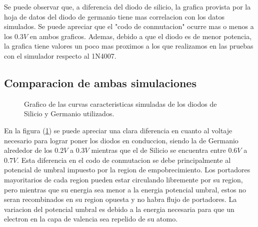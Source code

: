 \documentclass[chaptersright]{informeutn}
\begin{document}
        Se puede observar que, a diferencia del diodo de silicio, la grafica provista por la hoja de datos del diodo de
        germanio \cite{DS1} tiene mas correlacion con los datos simulados. Se puede apreciar que el "codo de
        conmutacion" ocurre mas o menos a los $0.3V$ en ambos graficos. Ademas, debido a que el diodo es de menor
        potencia, la grafica tiene valores un poco mas proximos a los que realizamos en las pruebas con el simulador
        respecto al 1N4007.

      \subsection{Comparacion de ambas simulaciones}

        \begin{figure}[!ht]
          \centering
          \caption{Grafico de las curvas caracteristicas simuladas de los diodos de Silicio y Germanio utilizados.}
          \label{graph.simulation.comparativa.directa}
        \end{figure}

        En la figura (\ref{graph.simulation.comparativa.directa}) se puede apreciar una clara diferencia en cuanto al voltaje
        necesario para lograr poner los diodos en conduccion, siendo la de Germanio alrededor de los $0.2V$ a $0.3V$
        mientras que el de Silicio se encuentra entre $0.6V$ a $0.7V$. Esta diferencia en el codo de conmutacion se
        debe principalmente al potencial de umbral impuesto por la region de empobrecimiento. Los portadores
        mayoritarios de cada region pueden estar circulando libremente por su region, pero mientras que su energia
        sea menor a la energia potencial umbral, estos no seran recombinados en su region opuesta y no habra flujo de
        portadores. La variacion del potencial umbral es debido a la energia necesaria para que un electron en la capa
        de valencia sea repelido de su atomo.
\end{document}
